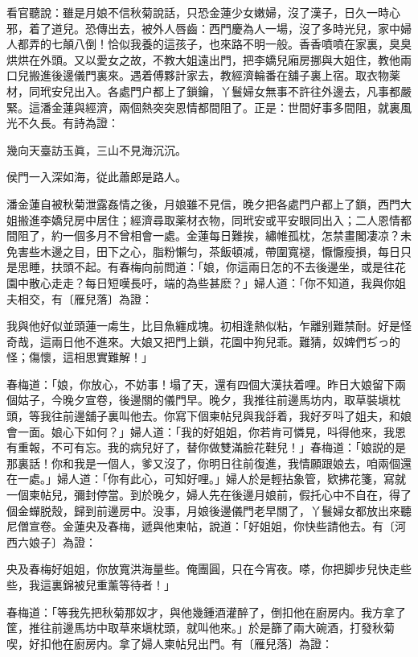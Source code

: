 看官聽說：雖是月娘不信秋菊說話，只恐金蓮少女嫩婦，沒了漢子，日久一時心邪，着了道兒。恐傳出去，被外人唇齒：西門慶為人一場，沒了多時光兒，家中婦人都弄的七顛八倒！恰似我養的這孩子，也來路不明一般。香香噴噴在家裏，臭臭烘烘在外頭。又以愛女之故，不教大姐遠出門，把李嬌兒廂房挪與大姐住，教他兩口兒搬進後邊儀門裏來。遇着傅夥計家去，教經濟輪番在舖子裏上宿。取衣物薬材，同玳安兒出入。各處門户都上了鎖鑰，丫鬟婦女無事不許往外邊去，凡事都嚴緊。這潘金蓮與經濟，兩個熱突突恩情都間阻了。正是：世間好事多間阻，就裏風光不久長。有詩為證：

\begin{myquote}
幾向天臺訪玉眞，三山不見海沉沉。

侯門一入深如海，従此蕭郎是路人。
\end{myquote}

潘金蓮自被秋菊泄露姦情之後，月娘雖不見信，晚夕把各處門户都上了鎖，西門大姐搬進李嬌兒房中居住；經濟尋取薬材衣物，同玳安或平安眼同出入；二人恩情都間阻了，約一個多月不曾相會一處。金蓮每日難挨，繡帷孤枕，怎禁畫閣凄凉？未免害些木邊之目，田下之心，脂粉懶匀，茶飯頓减，帶圍寬褪，懨懨瘦損，每日只是思睡，扶頭不起。有春梅向前問道：「娘，你這兩日怎的不去後邊坐，或是往花園中散心走走？每日短嘆長吁，端的為些甚麽？」婦人道：「你不知道，我與你姐夫相交，有〔雁兒落〕為證：

\begin{myquote}
我與他好似並頭蓮一䖏生，比目魚纏成塊。初相逢熱似粘，乍離别難禁耐。好是怪奇哉，這兩日他不進來。大娘又把門上鎖，花園中狗兒乖。難猜，奴婢們ぢっ的怪；傷懷，這相思實難解！」
\end{myquote}

春梅道：「娘，你放心，不妨事！塌了天，還有四個大漢扶着哩。昨日大娘留下兩個姑子，今晚夕宣卷，後邊關的儀門早。晚夕，我推往前邊馬坊内，取草裝塡枕頭，等我往前邊舖子裏叫他去。你寫下個柬帖兒與我㧱着，我好歹呌了姐夫，和娘會一面。娘心下如何？」婦人道：「我的好姐姐，你若肯可憐見，呌得他來，我恩有重報，不可有忘。我的病兒好了，替你做雙滿臉花鞋兒！」春梅道：「娘説的是那裏話！你和我是一個人，爹又沒了，你明日往前復進，我情願跟娘去，咱兩個還在一處。」婦人道：「你有此心，可知好哩。」婦人於是輕拈象管，欵拂花箋，寫就一個柬帖兒，彌封停當。到於晚夕，婦人先在後邊月娘前，假托心中不自在，得了個金蟬脱殼，歸到前邊房中。没事，月娘後邊儀門老早關了，丫鬟婦女都放出來聽尼僧宣卷。金蓮央及春梅，遞與他柬帖，說道：「好姐姐，你快些請他去。有〔河西六娘子〕為證：

央及春梅好姐姐，你放寬洪海量些。俺團圓，只在今宵夜。嗏，你把脚步兒快走些些，我這裏錦被兒重薰等待者！」

春梅道：「等我先把秋菊那奴才，與他幾鍾酒灌醉了，倒扣他在廚房内。我方拿了筐，推往前邊馬坊中取草來塡枕頭，就叫他來。」於是篩了兩大碗酒，打發秋菊喫，好扣他在廚房内。拿了婦人柬帖兒出門。有〔雁兒落〕為證：


